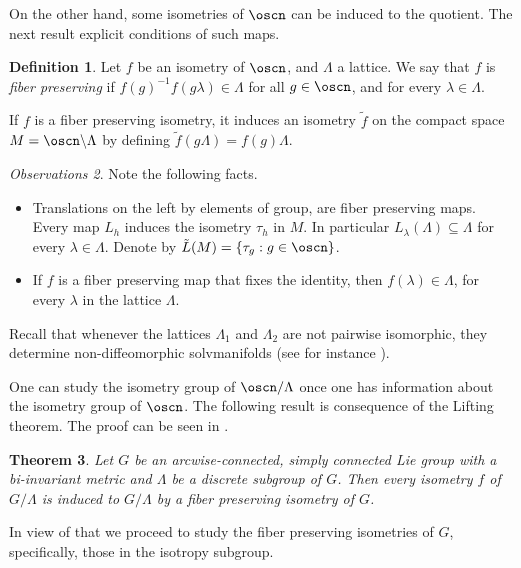 \documentclass[11pt]{amsart}
\theoremstyle{plain}
\newtheorem{thm}{Theorem}[section]
\theoremstyle{definition}
\newtheorem{defn}[thm]{Definition}
\theoremstyle{remark}
\newtheorem{obs}[thm]{Observations}
\begin{document}
On the other hand, some isometries of $\oscn$ can be induced to the quotient. The next result explicit conditions of such maps. %

\begin{defn} Let $f$ be  an isometry of $\oscn$, and $\Lambda$ a lattice. We say that $f$ is {\em fiber preserving} if $f(g)^{-1} f(g\lambda) \in\Lambda$ for all $g \in \oscn$, and for every $\lambda\in \Lambda$. 
\end{defn}
		If $f$ is a fiber preserving
isometry, it induces an isometry  $\tilde{f}$ on the compact space $M=\oscn\backslash \Lambda$   by defining $\tilde{f}(g\Lambda) = f(g)\Lambda$. 


\begin{obs} Note the following facts. 
	\begin{itemize}
		\item Translations on the left by elements of group, are fiber preserving maps. Every map $L_h$ induces the isometry $\tau_h$ in $M$. In particular $L_{\lambda}(\Lambda)\subseteq \Lambda$ for every $\lambda\in \Lambda$. Denote by  $\tilde{L}(M)=\{\tau_g:g\in \oscn\}$. 
		\item If $f$ is a fiber preserving map that fixes the identity, then $f(\lambda)\in \Lambda$, for every $\lambda$ in the lattice $\Lambda$. 
	\end{itemize}
	
\end{obs}


Recall that whenever the lattices $\Lambda_1$ and $\Lambda_2$ are not pairwise isomorphic, they determine non-diffeomorphic solvmanifolds (see for instance \cite{Ra}).

One can study the isometry group of $\oscn/\Lambda$ once one has information about the isometry group of $\oscn$. The following result is consequence of the Lifting theorem. The proof can be seen in \cite{BOV}.

\begin{thm} Let $G$ be an arcwise-connected, simply connected Lie group with a bi-invariant metric and $\Lambda$ be a discrete subgroup
of $G$. Then every isometry $f$ of $G/\Lambda$ is induced to $G/\Lambda$ by a fiber preserving isometry of $G$.
\end{thm}

In view of that we proceed to study the fiber preserving isometries of $G$, specifically, those in the isotropy subgroup.  
\end{document}
